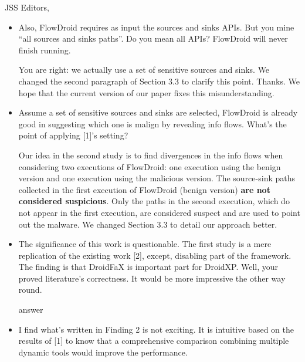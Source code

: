 \documentclass{letter}
\begin{document}
\begin{letter}{JSS Editors,}
\begin{itemize}
\vspace{0.2cm}

\item Also, FlowDroid requires as input the sources and sinks APIs. But you mine ``all sources and sinks 
paths''. Do you mean all APIs? FlowDroid will never finish running. 
\vspace{0.2cm}

{\color{blue}{\bf Answer.} You are right: we actually use a set of sensitive sources and sinks. We changed the second paragraph of Section 3.3 to clarify this point. Thanks. We hope that the current version of our paper fixes this misunderstanding.}

\vspace{0.2cm}
  
\item Assume a set of sensitive sources and sinks are selected, 
FlowDroid is already good in suggesting which one is malign by revealing info flows. What's the point of applying [1]'s setting?


\vspace{0.2cm}

{\color{blue}{\bf Answer.} Our idea in the second study is to find divergences in the info flows when considering two executions of FlowDroid: one execution using the benign version and one execution using the malicious version. The source-sink paths collected in the first execution of FlowDroid (benign version)
 {\bf are not considered suspicious}. Only the paths in the second execution, which do not appear in the first execution, are considered suspect and are used to point out the malware. We changed Section 3.3 to detail our approach better.}

\vspace{0.2cm}

\item The significance of this work is questionable. The first study is a mere replication of the existing work [2], except, disabling 
part of the framework. The finding is that DroidFaX is important part for DroidXP. Well, your proved literature's correctness. 
It would be more impressive the other way round.


\vspace{0.2cm}

{\color{blue}{\bf Answer:} answer}

\vspace{0.2cm}

\item I find what's written in Finding 2 is not exciting. It is intuitive based on the results of [1] to know that a comprehensive 
comparison combining multiple dynamic tools would improve the performance.



\end{itemize}
\end{letter}
\end{document}
